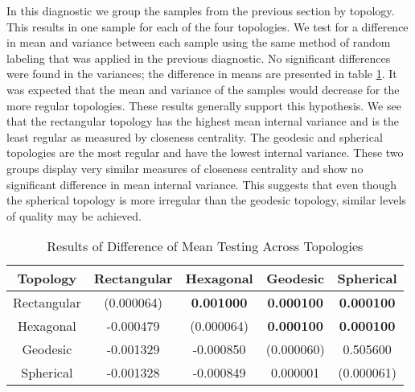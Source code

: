 In this diagnostic we group the samples from the previous section by topology.
This results in one sample for each of the four topologies.  We test for a
difference in mean and variance between each sample using the same method of
random labeling that was applied in the previous diagnostic.  No significant
differences were found in the variances; the difference in means are presented
in table \ref{rlt:all}.  It was expected that the mean and variance of the
samples would decrease for the more regular topologies.  These results
generally support this hypothesis. We see that the rectangular topology has
the highest mean internal variance and is the least regular as measured by
closeness centrality. The geodesic and spherical topologies are the most
regular and have the lowest internal variance. These two groups display very
similar measures of closeness centrality and show no significant difference in
mean internal variance.  This suggests that even though the spherical topology
is more irregular than the geodesic topology, similar levels of quality may be
achieved.


\begin{table}
  \begin{minipage}{\textwidth}
  \caption{Results of Difference of Mean Testing Across Topologies}
  \label{rlt:all}
  \begin{tabular}{|c||c|c|c|c|}
  \hline
  \textbf{Topology}&Rectangular	&Hexagonal &Geodesic &Spherical\\\hline
  \hline
   Rectangular & (0.000064) & \textbf{0.001000} & \textbf{0.000100} & \textbf{0.000100}\\\hline
   Hexagonal & -0.000479 & (0.000064) & \textbf{0.000100} & \textbf{0.000100}\\\hline
   Geodesic & -0.001329 & -0.000850 & (0.000060) & 0.505600\\\hline
   Spherical & -0.001328 & -0.000849 & 0.000001 & (0.000061)\\\hline

  \end{tabular}
  \end{minipage}
\end{table}



